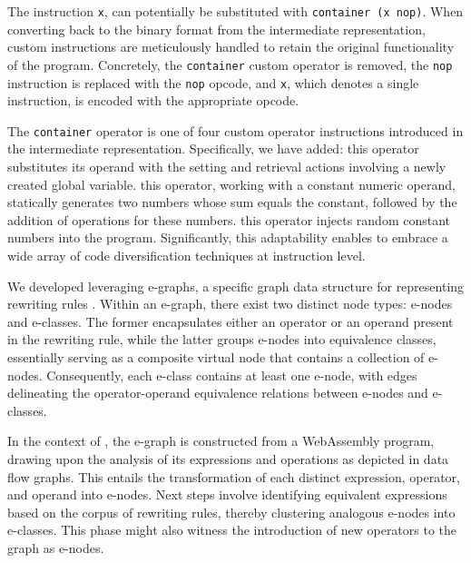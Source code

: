 

The instruction \texttt{x}, can potentially be substituted with \texttt{container (x nop)}. 
When converting back to the \Wasm binary format from the intermediate representation, custom instructions are meticulously handled to retain the original functionality of the \Wasm program. 
Concretely, the \texttt{container} custom operator is removed, the \texttt{nop} instruction is replaced with the \texttt{nop} opcode, and \texttt{x}, which denotes a single instruction, is encoded with the appropriate opcode.

The \texttt{container} operator is one of four custom operator instructions introduced in the \tool intermediate representation. 
Specifically, we have added:
 this operator substitutes its operand with the setting and retrieval actions involving a newly created global variable.
 this operator, working with a constant numeric operand, statically generates two numbers whose sum equals the constant, followed by the addition of operations for these numbers.
 this operator injects random constant numbers into the program.
Significantly, this adaptability enables \tool to embrace a wide array of code diversification techniques at instruction level.


\label{alg}

We developed \tool leveraging e-graphs, a specific graph data structure for representing rewriting rules \cite{10.1145/3571207}. 
Within an e-graph, there exist two distinct node types: e-nodes and e-classes. 
The former encapsulates either an operator or an operand present in the rewriting rule, while the latter groups e-nodes into equivalence classes, essentially serving as a composite virtual node that contains a collection of e-nodes. 
Consequently, each e-class contains at least one e-node, with edges delineating the operator-operand equivalence relations between e-nodes and e-classes.

In the context of \tool, the e-graph is constructed from a WebAssembly program, drawing upon the analysis of its expressions and operations as depicted in data flow graphs. 
This entails the transformation of each distinct expression, operator, and operand into e-nodes. 
Next steps involve identifying equivalent expressions based on the corpus of rewriting rules, thereby clustering analogous e-nodes into e-classes. 
This phase might also witness the introduction of new operators to the graph as e-nodes.

